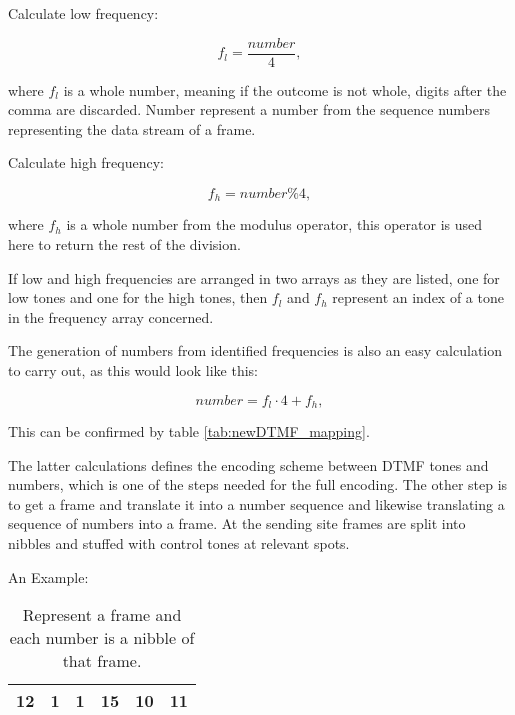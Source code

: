 	Calculate low frequency:
	\begin{center}\begin{equation}f_{l} = \frac{number}{4},\end{equation}\end{center}
	where $f_{l}$ is a whole number, meaning if the outcome is not whole, digits after the comma are discarded. Number
	represent a number from the sequence numbers representing the data stream of a frame.
	
	Calculate high frequency:
	\begin{center}\begin{equation}f_{h} = number\%4,\end{equation}\end{center}
	where $f_{h}$ is a whole number from the modulus operator, this operator is used here to return the rest of the division.
	
	If low and high frequencies are arranged in two arrays as they are listed, one for low tones and one for the high tones,
	then $f_{l}$ and $f_{h}$ represent an index of a tone in the frequency array concerned.
	
	The generation of numbers from identified frequencies is also an easy calculation to carry out, as this would look like this:
	\begin{center}\begin{equation}number = f_{l} \cdot 4 + f_{h},\end{equation}\end{center}
	This can be confirmed by table \ref{tab:newDTMF_mapping}.
	
	The latter calculations defines the encoding scheme between DTMF tones and numbers, which is one of the steps needed for
	the full encoding. The other step is to get a frame and translate it into a number sequence and likewise translating a
	sequence of numbers into a frame. At the sending site frames are split into nibbles and stuffed with control tones at relevant
	spots.
	
	An Example:
	
	\begin{table}[htb]
		\begin{center}
			\begin{tabular}{|c|c|c|c|c|c|}
			\hline
			12 & 1 & 1 & 15 & 10 & 11 \\
			\hline
			\end{tabular}
		\end{center}
		\caption{Represent a frame and each number is a nibble of that frame.}
		\label{tab:physical_frame}
	\end{table}
	
